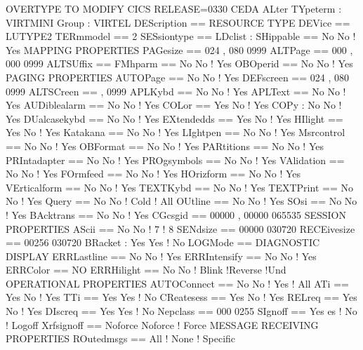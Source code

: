 \documentclass[letterpaper,10pt,english]{sphinxmanual}
\begin{document}
\begin{sphinxVerbatim}[commandchars=\\\{\}]
OVERTYPE TO MODIFY CICS RELEASE=0330
CEDA ALter
TYpeterm : VIRTMINI
Group : VIRTEL
DEScription ==\PYGZgt{}
RESOURCE TYPE
DEVice ==\PYGZgt{} LUTYPE2
TERmmodel ==\PYGZgt{} 2
SESsiontype ==\PYGZgt{}
LDclist :
SHippable ==\PYGZgt{} No      No ! Yes
MAPPING PROPERTIES
PAGesize ==\PYGZgt{} 024 ,    080 0\PYGZhy{}999
ALTPage ==\PYGZgt{} 000 ,     000 0\PYGZhy{}999
ALTSUffix ==\PYGZgt{}
FMhparm ==\PYGZgt{} No No !   Yes
OBOperid ==\PYGZgt{} No No !  Yes
PAGING PROPERTIES
AUTOPage ==\PYGZgt{} No No !  Yes
DEFscreen ==\PYGZgt{} 024 ,   080 0\PYGZhy{}999
ALTSCreen ==\PYGZgt{} ,       0\PYGZhy{}999
APLKybd ==\PYGZgt{} No        No ! Yes
APLText ==\PYGZgt{} No        No ! Yes
AUDiblealarm ==\PYGZgt{} No   No ! Yes
COLor ==\PYGZgt{} Yes         No ! Yes
COPy : No             No ! Yes
DUalcasekybd ==\PYGZgt{} No   No ! Yes
EXtendedds ==\PYGZgt{} Yes    No ! Yes
HIlight ==\PYGZgt{} Yes       No ! Yes
Katakana ==\PYGZgt{} No       No ! Yes
LIghtpen ==\PYGZgt{} No       No ! Yes
Msrcontrol ==\PYGZgt{} No     No ! Yes
OBFormat ==\PYGZgt{} No       No ! Yes
PARtitions ==\PYGZgt{} No     No ! Yes
PRIntadapter ==\PYGZgt{} No   No ! Yes
PROgsymbols ==\PYGZgt{} No    No ! Yes
VAlidation ==\PYGZgt{} No     No ! Yes
FOrmfeed ==\PYGZgt{} No       No ! Yes
HOrizform ==\PYGZgt{} No      No ! Yes
VErticalform ==\PYGZgt{} No   No ! Yes
TEXTKybd ==\PYGZgt{} No       No ! Yes
TEXTPrint ==\PYGZgt{} No      No ! Yes
Query ==\PYGZgt{} No          No ! Cold ! All
OUtline ==\PYGZgt{} No        No ! Yes
SOsi ==\PYGZgt{} No           No ! Yes
BAcktrans ==\PYGZgt{} No      No ! Yes
CGcsgid ==\PYGZgt{} 00000 ,   00000 0\PYGZhy{}65535
SESSION PROPERTIES
AScii ==\PYGZgt{} No          No ! 7 ! 8
SENdsize ==\PYGZgt{} 00000    0\PYGZhy{}30720
RECEivesize ==\PYGZgt{} 00256 0\PYGZhy{}30720
BRacket : Yes         Yes ! No
LOGMode ==\PYGZgt{}
DIAGNOSTIC DISPLAY
ERRLastline ==\PYGZgt{} No    No ! Yes
ERRIntensify ==\PYGZgt{} No   No ! Yes
ERRColor ==\PYGZgt{} NO
ERRHilight ==\PYGZgt{} No     No ! Blink !Reverse !Und
OPERATIONAL PROPERTIES
AUTOConnect ==\PYGZgt{} No    No ! Yes ! All
ATi ==\PYGZgt{} Yes           No ! Yes
TTi ==\PYGZgt{} Yes           Yes ! No
CReatesess ==\PYGZgt{} Yes    No ! Yes
RELreq ==\PYGZgt{} Yes        No ! Yes
DIscreq ==\PYGZgt{} Yes       Yes ! No
Nepclass ==\PYGZgt{} 000      0\PYGZhy{}255
SIgnoff ==\PYGZgt{} Yes         es ! No ! Logoff
Xrfsignoff ==\PYGZgt{} Noforce Noforce ! Force
MESSAGE RECEIVING PROPERTIES
ROutedmsgs ==\PYGZgt{} All ! None ! Specific

\end{sphinxVerbatim}
\end{document}
